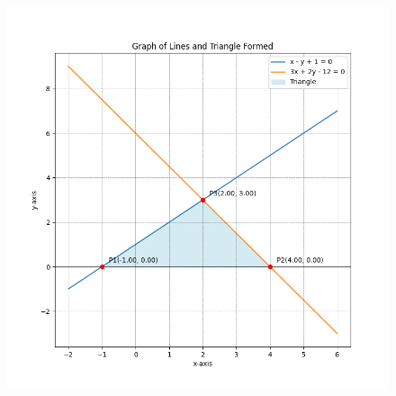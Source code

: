 \documentclass[journal]{IEEEtran}
\numberwithin{equation}{enumi}
\numberwithin{figure}{enumi}
\begin{document}
\begin{figure}[h!]
   \centering
   \includegraphics[width=0.7\linewidth]{figs/Figure_1.png}
\end{figure}
\end{document}
